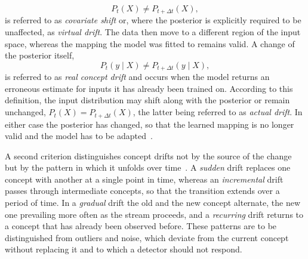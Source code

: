 %
\begin{equation} \label{eq:covariate_shift}
    P_t(X) \neq P_{t+\Delta t}(X),
\end{equation}
%
is referred to as \emph{covariate shift} or, where the posterior is explicitly required to be unaffected, as \emph{virtual drift}. The data then move to a different region of the input space, whereas the mapping the model was fitted to remains valid. A change of the posterior itself,
%
\begin{equation} \label{eq:real_concept_drift}
    P_t(y \mid X) \neq P_{t+\Delta t}(y \mid X),
\end{equation}
%
is referred to as \emph{real concept drift} and occurs when the model returns an erroneous estimate for inputs it has already been trained on. According to this definition, the input distribution may shift along with the posterior or remain unchanged, $P_t(X) = P_{t+\Delta t}(X)$, the latter being referred to as \emph{actual drift}. In either case the posterior has changed, so that the learned mapping is no longer valid and the model has to be adapted~\cite{gama.2014, bayram.2022a}. \par
%
A second criterion distinguishes concept drifts not by the source of the change but by the pattern in which it unfolds over time~\cite{gama.2014, bayram.2022a}. A \emph{sudden} drift replaces one concept with another at a single point in time, whereas an \emph{incremental} drift passes through intermediate concepts, so that the transition extends over a period of time. In a \emph{gradual} drift the old and the new concept alternate, the new one prevailing more often as the stream proceeds, and a \emph{recurring} drift returns to a concept that has already been observed before. These patterns are to be distinguished from outliers and noise, which deviate from the current concept without replacing it and to which a detector should not respond. \par
%

